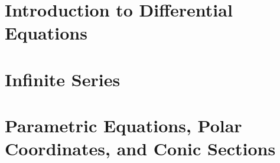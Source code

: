 \documentclass{nosvagor-notes}
\begin{document}
\chapter{Introduction to Differential Equations}











\chapter{Infinite Series}



















\chapter{Parametric Equations, Polar Coordinates, and Conic Sections}










\end{document}
